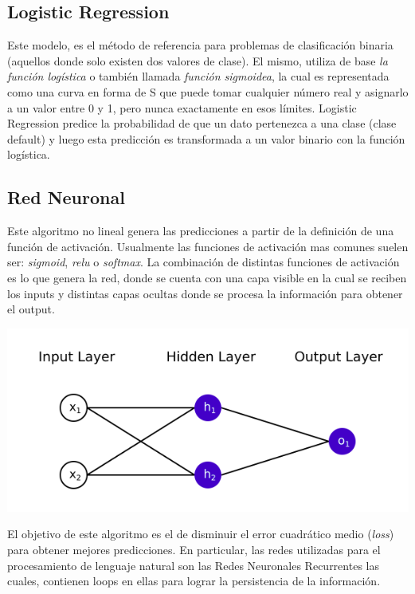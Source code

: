 \documentclass[12pt,a4paper]{article}
\begin{document}
\subsection{Logistic Regression}
Este modelo, es el método de referencia para problemas de clasificación binaria (aquellos donde solo existen dos valores de clase). El mismo, utiliza de base \textit{la función logística} o también llamada \textit{función sigmoidea}, la cual es representada como una curva en forma de S que puede tomar cualquier número real y asignarlo a un valor entre 0 y 1, pero nunca exactamente en esos límites. Logistic Regression predice la probabilidad de que un dato pertenezca a una clase (clase default) y luego esta predicción es transformada a un valor binario con la función logística. 

\subsection{Red Neuronal}
Este algoritmo no lineal genera las predicciones a partir de la definición de una función de activación. Usualmente las funciones de activación mas comunes suelen ser: \textit{sigmoid}, \textit{relu} o \textit{softmax}. La combinación de distintas funciones de activación es lo que genera la red, donde se cuenta con una capa visible en la cual se reciben los inputs y distintas capas ocultas donde se procesa la información para obtener el output.

\begin{center}
    \includegraphics[scale=0.5]{imgs/red neuronal.png}
\end{center}

El objetivo de este algoritmo es el de disminuir el error cuadrático medio (\textit{loss}) para obtener mejores predicciones.
En particular, las redes utilizadas para el procesamiento de lenguaje natural son las Redes Neuronales Recurrentes las cuales, contienen loops en ellas para lograr la persistencia de la información. 
\end{document}
